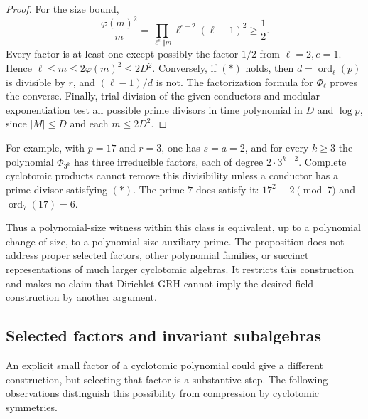 \documentclass[11pt]{article}
\theoremstyle{definition}
\theoremstyle{remark}
\begin{document}
\begin{proof}
For the size bound,
\[
 \frac{\varphi(m)^2}{m}
 =\prod_{\ell^e\Vert m}\ell^{e-2}(\ell-1)^2\ge\frac12.
\]
Every factor is at least one except possibly the factor $1/2$ from
$\ell=2,e=1$.  Hence $\ell\le m\le2\varphi(m)^2\le2D^2$.
Conversely, if \textup{\((*)\)} holds, then
$d=\operatorname{ord}_\ell(p)$ is divisible by $r$, and
$(\ell-1)/d$ is not.  The factorization formula for $\Phi_\ell$
proves the converse.
Finally, trial division of the given conductors and modular
exponentiation test all possible prime divisors in time polynomial in
$D$ and $\log p$, since $|M|\le D$ and each $m\le2D^2$.
\end{proof}

For example, with $p=17$ and $r=3$, one has $s=a=2$, and for every
$k\ge3$ the polynomial $\Phi_{3^k}$ has three irreducible factors,
each of degree $2\cdot3^{k-2}$.  Complete cyclotomic products cannot
remove this divisibility unless a conductor has a prime divisor
satisfying \textup{\((*)\)}.  The prime $7$ does satisfy it:
$17^2\equiv2\pmod7$ and $\operatorname{ord}_7(17)=6$.

Thus a polynomial-size witness within this class is equivalent, up to
a polynomial change of size, to a polynomial-size auxiliary prime.
The proposition does not address proper selected factors, other
polynomial families, or succinct representations of much larger
cyclotomic algebras.  It restricts this construction and makes no claim
that Dirichlet GRH cannot imply the desired field construction by
another argument.


\subsection{Selected factors and invariant subalgebras}

An explicit small factor of a cyclotomic polynomial could give a
different construction, but selecting that factor is a substantive
step.  The following observations distinguish this possibility from
compression by cyclotomic symmetries.
\end{document}
